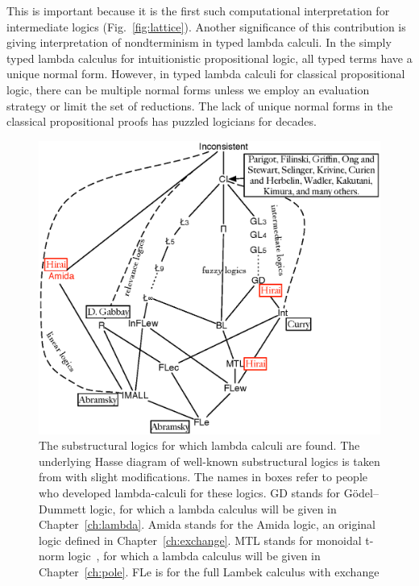 This is important because it is the first such computational
interpretation for intermediate logics (Fig.~\ref{fig:lattice}).
Another significance of this contribution
is giving interpretation of nondterminism in typed
lambda calculi.  In the simply typed lambda calculus for intuitionistic
propositional logic, all typed terms have a unique normal form.
However, in typed lambda calculi for classical propositional logic,
there can be multiple normal forms unless we employ an evaluation
strategy or limit the set of reductions.
The lack of unique normal forms in the classical propositional proofs
has puzzled logicians for decades. 
 \begin{figure}
  \centering
  \includegraphics[scale=0.8]{lattice.eps}
  \caption[The substructural logics with lambda calculi.]
  {The substructural logics for which lambda calculi are found.
  The underlying Hasse diagram of well-known substructural logics is
  taken from
  \cite[p.~120]{residuated} with slight modifications.
  The names in boxes refer to people who developed lambda-calculi for
  these logics.
  \textsf{GD} stands for G\"odel--Dummett logic, for which
  a lambda calculus will be given in
  Chapter~\ref{ch:lambda}.
  \textsf{Amida} stands for the Amida logic, an original logic
  defined in Chapter~\ref{ch:exchange}.
  \textsf{MTL} stands for monoidal t-norm logic~\citep{Esteva2001271},
  for which a lambda calculus will be given
  in Chapter~\ref{ch:pole}.
  \textsf{FLe} is for the full Lambek calculus with exchange
}
\end{figure}

